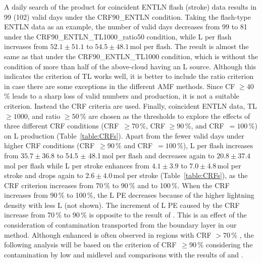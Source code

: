 \documentclass[amt]{copernicus}
\begin{document}
A daily search of the  product for coincident ENTLN flash (stroke) data results in 99 (102) valid days under the CRF90\_ENTLN condition.
Taking the flash-type ENTLN data as an example, the number of valid days decreases from 99 to 81 under the CRF90\_ENTLN\_TL1000\_ratio50 condition, while L per flash increases from $52.1\pm 51.1$ to $54.5\pm 48.1$\,mol per flash.
The result is almost the same as that under the CRF90\_ENTLN\_TL1000 condition, which is without the condition of more than half of the above-cloud  having an L source.
Although this indicates the criterion of TL works well, it is better to include the ratio criterion in case there are some exceptions in the different AMF methods.
Since CF $\geq 40$\,{\%} leads to a sharp loss of valid numbers and production, it is not a suitable criterion.
Instead the CRF criteria are used.
Finally, coincident ENTLN data, TL $\geq 1000$, and ratio $\geq 50$\,{\%} are chosen as the thresholds to explore the effects of three different CRF conditions (CRF~$\geq 70\,{\%}$, CRF $\geq 90$\,{\%}, and CRF~$= 100$\,{\%}) on L production (Table~\ref{table:CRFs}).
Apart from the fewer valid days under higher CRF conditions (CRF~$\geq 90\,{\%}$ and CRF~$= 100$\,{\%}), L per flash increases from $35.7 \pm 36.8$ to 54.5 $\pm$ 48.1\,mol per flash and decreases again to $20.8 \pm 37.4$\,mol per flash while L per stroke enhances from $4.1  \pm 3.9 $ to $7.0\pm 4.8$\,mol per stroke and drops again to $2.6 \pm 4.0$\,mol per stroke (Table~\ref{table:CRFs}), as the CRF criterion increases from 70\,{\%} to 90\,{\%} and to 100\,{\%}.
When the CRF increases from 90\,{\%} to 100\,{\%}, the L PE decreases because of the higher lightning density with less L (not shown).
The increment of L PE caused by the CRF increase from 70\,{\%} to 90\,{\%} is opposite to the result of \citet{Pickering.2016}.
This is an effect of the consideration of  contamination transported from the boundary layer in our method.
Although enhanced  is often observed in regions with CRF $> 70$\,{\%} \citep{Pickering.2016}, the following analysis will be based on the criterion of CRF~$\geq 90$\,{\%} considering the contamination by low and midlevel  and comparisons with the results of \citet{Pickering.2016} and \citet{Lapierre.2020}.
\end{document}
